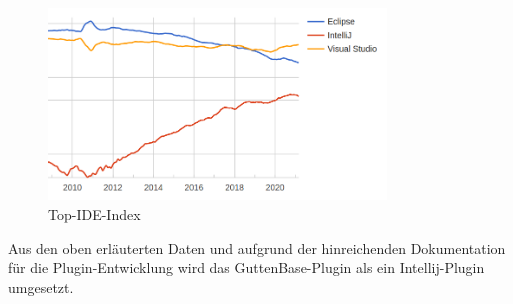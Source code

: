 \begin{figure}[H]
	\centering
	\includegraphics[width=0.8\textwidth]{images/ide-index}
	\caption{Top-IDE-Index}
	\label{img:ide-index}
\end{figure}
Aus den oben erläuterten Daten und aufgrund der hinreichenden Dokumentation für die Plugin-Entwicklung wird das GuttenBase-Plugin als ein Intellij-Plugin umgesetzt.

